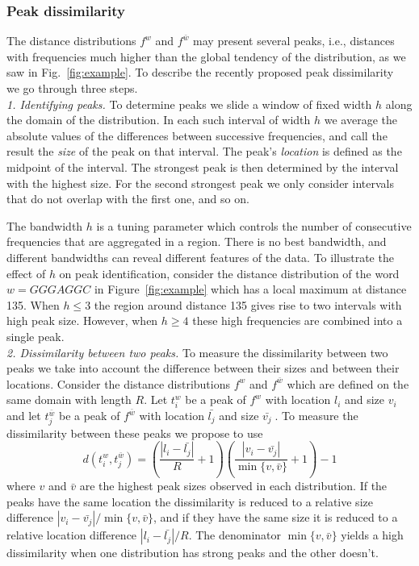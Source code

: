 \documentclass[review,12pt]{elsarticle}
\begin{document}
\subsubsection{Peak dissimilarity}
The distance distributions $f^w$ and $f^{\bar{w}}$
may present several peaks, i.e., distances with
frequencies much higher than the global tendency
of the distribution, as we saw in
Fig.~\ref{fig:example}.
To describe the recently proposed peak
dissimilarity~\cite{tavares2017pacbb} we go
through three steps.\\

{\it 1. Identifying peaks.}
To determine peaks we slide a window of fixed
width $h$ along the domain of the distribution.
In each such interval of width $h$ we average
the absolute values of the differences between
successive frequencies, and call the result the
{\it size} of the peak on that interval.
The peak's {\it location} is defined as the midpoint of the interval. The strongest peak
is then determined by the interval with the highest size. For the second strongest peak
we only consider intervals that do not overlap with
the first one, and so on.

The bandwidth $h$ is a tuning parameter which
controls the number of
consecutive frequencies that are aggregated in
a region. There
is no best bandwidth, and different bandwidths
can reveal different features of the data. To
illustrate the effect of $h$ on peak
identification, consider the distance
distribution of the word $w=GGGAGGC$
in Figure~\ref{fig:example} which has a local
maximum
at distance 135.
When $h \leq 3$ the region around distance 135
gives rise to two intervals with high
peak size. However, when $h \geq 4$ these high
frequencies are combined into a single peak.
\\


{\it 2. Dissimilarity between two peaks.}
To measure the dissimilarity between two peaks
we take into account the difference between their
sizes and between their locations. Consider the
distance distributions $f^w$ and $f^{\bar{w}}$ which
are defined on the same domain with length $R$.
Let $t^w_i$ be a peak of $f^w$ with location
$l_i$ and size $v_i$ and let $t^{\bar{w}}_j$
be a peak of $f^{\bar{w}}$ with location
$\bar{l_j}$ and size $\bar{v_j}\;$.
To measure the dissimilarity
between these peaks we propose to use
%
\begin{equation}
  d(t^w_i, t^{\bar{w}}_j)=
	\left(\frac{|l_i-\bar{l_j}|}{R}+1\right)
	\left(\frac{|v_i-\bar{v_j}|}
	{\min\{v,\bar{v}\}}+1\right)-1
\label{eq:distD}
\end{equation}
%
where $v$  and $\bar{v}$ are the highest peak
sizes observed in each distribution.
If the peaks have the same location the
dissimilarity is reduced to a relative size
difference
$|v_i-\bar{v_j}|/\min\{v,\bar{v}\}$, and if
they have the same size it is reduced to a
relative location
difference $|l_i-\bar{l_j}|/R$. The denominator
$\min\{v,\bar{v}\}$ yields a high dissimilarity
when one distribution has strong peaks
and the other doesn't.\\
\end{document}
